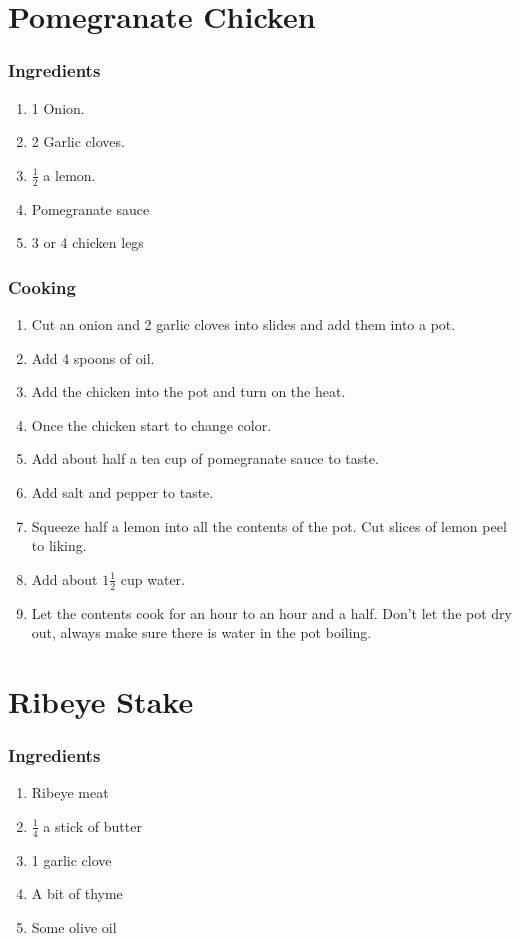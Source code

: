 \section{Pomegranate Chicken}
\subsubsection{Ingredients}
\begin{enumerate}
    \item 1 Onion.
    \item 2 Garlic cloves.
    \item \(\frac{1}{2}\) a lemon.
    \item Pomegranate sauce
    \item 3 or 4 chicken legs
\end{enumerate}

\subsubsection{Cooking}
\begin{enumerate}
    \item Cut an onion and 2 garlic cloves into slides and add them into a pot.
    \item Add 4 spoons of oil.
    \item Add the chicken into the pot and turn on the heat.
    \item Once the chicken start to change color.
    \item Add about half a tea cup of pomegranate sauce to taste.
    \item Add salt and pepper to taste.
    \item Squeeze half a lemon into all the contents of the pot. Cut slices of lemon peel to liking.
    \item Add about \(1\frac{1}{2}\) cup water.
    \item Let the contents cook for an hour to an hour and a half. Don't let the pot dry out, always make sure there is water in the pot boiling.
\end{enumerate}

\section{Ribeye Stake}
\subsubsection{Ingredients}
\begin{enumerate}
    \item Ribeye meat
    \item $\frac{1}{4}$ a stick of butter
    \item 1 garlic clove
    \item A bit of thyme
    \item Some olive oil
\end{enumerate}

